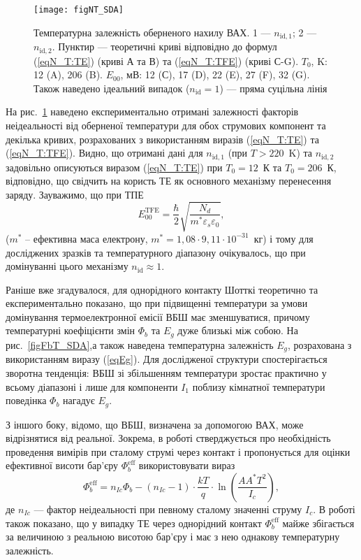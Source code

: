 \begin{figure}
\center
\texttt{[image: figNT\_SDA]}
\caption{\label{figNT_SDA}
Температурна залежність оберненого нахилу ВАХ.
1 --- $n_{\mathrm{id},1}$;
2 --- $n_{\mathrm{id},2}$.
Пунктир --- теоретичні криві відповідно до формул (\ref{eqN_T:TE}) (криві А та В)
та (\ref{eqN_T:TFE}) (криві С-G).
$T_0$, K: 12 (A), 206 (B).
$E_{00}$, мВ: 12 (С), 17 (D), 22 (E), 27 (F), 32 (G).
Також наведено ідеальний випадок ($n_{\mathrm{id}}=1$) --- пряма суцільна лінія
}%
\end{figure}

На рис.~\ref{figNT_SDA} наведено експериментально отримані залежності факторів неідеальності від оберненої температури
для обох струмових компонент та декілька кривих, розрахованих з використанням виразів (\ref{eqN_T:TE}) та (\ref{eqN_T:TFE}).
Видно, що отримані дані для $n_{\mathrm{id},1}$ (при $T>220$~K) та $n_{\mathrm{id},2}$ задовільно описуються
виразом (\ref{eqN_T:TE}) при $T_0=12$~К та $T_0=206$~К, відповідно,
що свідчить на користь ТЕ як основного механізму перенесення заряду.
Зауважимо, що при ТПЕ
\begin{equation}\label{eqE00:TFE}
E_{00}^\mathrm{TFE}=\frac{\hbar}{2}\sqrt{\frac{N_d}{m^*\varepsilon_s\varepsilon_0}},
\end{equation}
($m^*$ -- ефективна маса електрону, $m^*=1,08\cdot9,11\cdot10^{-31}$~кг)
і тому для досліджених зразків та температурного діапазону очікувалось, що при домінуванні цього механізму $n_\mathrm{id}\approx1$.



Раніше вже згадувалося, для однорідного контакту Шотткі теоретично \cite{Rhoderick1988} та експериментально \cite{Aboelfotoh,Zhua} показано,
що при підвищенні температури за умови домінування термоелектронної емісії ВБШ має зменшуватися,
причому температурні коефіцієнти змін $\Phi_b$ та  $E_g$ дуже близькі між собою.
На рис.~\ref{figFbT_SDA},а також наведена температурна залежність $E_g$, розрахована з використанням
виразу (\ref{eqEg}).
Для дослідженої структури спостерігається зворотна тенденція: ВБШ зі збільшенням температури зростає практично у всьому
діапазоні
і лише для компоненти $I_1$ поблизу кімнатної температури поведінка $\Phi_b$ нагадує $E_g$.

З іншого боку, відомо, що ВБШ, визначена за допомогою ВАХ, може відрізнятися від реальної.
Зокрема, в роботі \cite{Bozhkov} стверджується про необхідність проведення вимірів при сталому струмі через контакт
і пропонується для оцінки ефективної висоти бар'єру $\Phi_{b}^\mathrm{eff}$ використовувати вираз
\begin{equation}\label{eqBoz}
\Phi_{b}^\mathrm{eff}=n_{Ic}\Phi_b-(n_{Ic}-1)\cdot\frac{kT}{q}\cdot\ln\left(\frac{AA^*T^2}{I_c}\right),
\end{equation}
де
$n_{Ic}$ --- фактор неідеальності при певному сталому значенні струму $I_c$.
В роботі \cite{Bozhkov} також показано, що у випадку ТЕ через однорідний контакт $\Phi_{b}^\mathrm{eff}$ майже збігається за величиною
з реальною висотою бар'єру і має з нею однакову температурну залежність.

